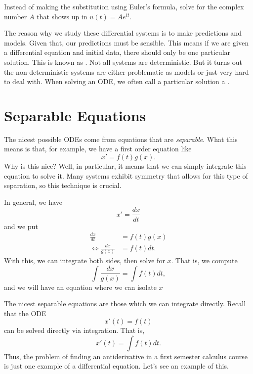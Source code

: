         \begin{exercise}
            Instead of making the substitution using Euler's formula, solve for the complex number $A$ that shows up in $u(t)=Ae^{it}$.
        \end{exercise}

        The reason why we study these differential systems is to make predictions and models.  Given that, our predictions must be sensible. This means if we are given a differential equation and initial data, there should only be one particular solution.  This is known as .     Not all systems are deterministic.  But it turns out the non-deterministic systems are either problematic as models or just very hard to deal with. When solving an ODE, we often call a particular solution a .

        \section{Separable Equations}
        The nicest possible ODEs come from equations that are \emph{separable}.  What this means is that, for example, we have a first order equation like
        \[
        x'=f(t)g(x).
        \]
        Why is this nice? Well, in particular, it means that we can simply integrate this equation to solve it.  Many systems exhibit symmetry that allows for this type of separation, so this technique is crucial.

        In general, we have
        \[
        x'=\frac{dx}{dt}
        \]
        and we put
        \begin{align*}
            \frac{dx}{dt}&=f(t)g(x)\\
            \iff \frac{dx}{g(x)} &= f(t)dt.
        \end{align*}
        With this, we can integrate both sides, then solve for $x$. That is, we compute
        \[
        \int \frac{dx}{g(x)} = \int f(t)dt,
        \]
        and we will have an equation where we can isolate $x$

        The nicest separable equations are those which we can integrate directly.  Recall that the ODE
        \[
            x'(t) =f(t)
        \]
        can be solved directly via integration.  That is,
        \[
            x'(t) = \int f(t)dt.
        \]
        Thus, the problem of finding an antiderivative in a first semester calculus course is just one example of a differential equation.  Let's see an example of this.

